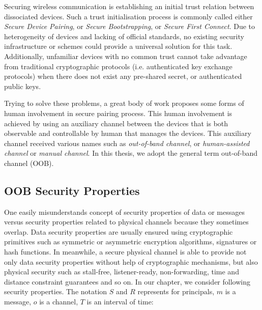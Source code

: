 Securing wireless communication is establishing an initial trust relation between dissociated devices. Such a trust initialisation process is commonly called either \textit{Secure Device Pairing}, or \textit{Secure Bootstrapping}, or \textit{Secure First Connect}. Due to heterogeneity of devices and lacking of official standards, no existing security infrastructure or schemes could provide a universal solution for this task. Additionally, unfamiliar devices with no common trust cannot take advantage from traditional cryptographic protocols (i.e. authenticated key exchange protocols) when there does not exist any pre-shared secret, or authenticated public keys.

Trying to solve these problems, a great body of work proposes some forms of human involvement in secure pairing process. This human involvement is achieved by using an auxiliary channel between the devices that is both observable and controllable by human that manages the devices. This auxiliary channel received various names such as \textit{out-of-band channel}, or \textit{human-assisted channel} or \textit{manual channel}. In this thesis, we adopt the general term out-of-band channel (OOB). 

\subsection{OOB Security Properties}

One easily misunderstands concept of security properties of data or messages versus security properties related to physical channels because they sometimes overlap. Data security properties are usually ensured using cryptographic primitives such as symmetric or asymmetric encryption algorithms, signatures or hash functions. In meanwhile, a secure physical channel is able to provide not only data security properties without help of cryptographic mechanisms, but also physical security such as stall-free, listener-ready, non-forwarding, time and distance constraint guarantees and so on. In our chapter, we consider following security properties. The notation $S$ and $R$ represents for principals, $m$ is a message, $o$ is a channel, $T$ is an interval of time:

